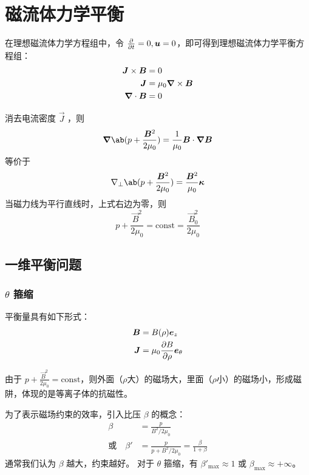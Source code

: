 
\chapter{磁流体力学平衡}

在理想磁流体力学方程组中，令 $\pdv{}{t} = 0, \bm{u} = 0$，即可得到理想磁流体力学平衡方程组：
\begin{subequations}\begin{align}
    \bm{J} \times \bm{B} &= 0 \\
    \bm{J} &= \mu_0 \bm{\nabla} \times{\bm{B}} \\
    \bm{\nabla} \cdot{\bm{B}} &= 0
\end{align}\end{subequations}

消去电流密度 $\vec{J}$ ，则
\begin{equation}
    \grad{\ab( p + \frac{\vec{B}^2}{2 \mu_0} )} = \frac{1}{\mu_0} \vec{B} \cdot \grad{\vec{B}}
\end{equation}
等价于
\begin{equation}
    \nabla_\perp \ab( p + \frac{\vec{B}^2}{2 \mu_0} ) = \frac{\vec{B}^2}{\mu_0} \vec{\kappa}
\end{equation}
当磁力线为平行直线时，上式右边为零，则
\begin{equation}
    p + \frac{\vec{B}^2}{2 \mu_0} = \text{const} = \frac{\vec{B}_0^2}{2 \mu_0}
\end{equation}

\section{一维平衡问题}

\subsection{\texorpdfstring{$\theta$}{theta} 箍缩}

平衡量具有如下形式：
\begin{subequations}\begin{align}
\bm{B} &= B(\rho) \bm{e}_z \\
\bm{J} &= \mu_0 \pdv{B}{\rho} \bm{e}_\theta
\end{align}\end{subequations}

由于 $p + \frac{\vec{B}^2}{2 \mu_0} = \text{const}$，则外面（$\rho$大）的磁场大，里面（$\rho$小）的磁场小，形成磁阱，体现的是等离子体的抗磁性。

为了表示磁场约束的效率，引入比压 $\beta$ 的概念：
\begin{subequations}\begin{align}
\beta &= \frac{p}{B^2 / 2 \mu_0} \\
\text{或} \quad \beta' &= \frac{p}{p + B^2 / 2 \mu_0}
= \frac{\beta}{1 + \beta}
\end{align}\end{subequations}
通常我们认为 $\beta$ 越大，约束越好。
对于 $\theta$ 箍缩，有 $\beta'_{\max} \approx 1$ 或 $\beta_{\max} \approx + \infty$。

